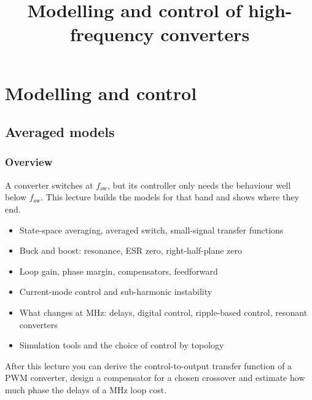 \title[Modelling and control]{Modelling and control of high-frequency converters}
\section{Modelling and control}

\begin{frame}[plain]
	\titlepage
\end{frame}

\subsection{Averaged models}

\begin{frame}
	\frametitle{Overview}
	A converter switches at $f_\mathrm{sw}$, but its controller only needs the behaviour well below $f_\mathrm{sw}$. This lecture builds the models for that band and shows where they end.
	\begin{itemize}
		\item State-space averaging, averaged switch, small-signal transfer functions
		\item Buck and boost: resonance, ESR zero, right-half-plane zero
		\item Loop gain, phase margin, compensators, feedforward
		\item Current-mode control and sub-harmonic instability
		\item What changes at MHz: delays, digital control, ripple-based control, resonant converters
		\item Simulation tools and the choice of control by topology
	\end{itemize}
	After this lecture you can derive the control-to-output transfer function of a PWM converter, design a compensator for a chosen crossover and estimate how much phase the delays of a MHz loop cost.
\end{frame}

